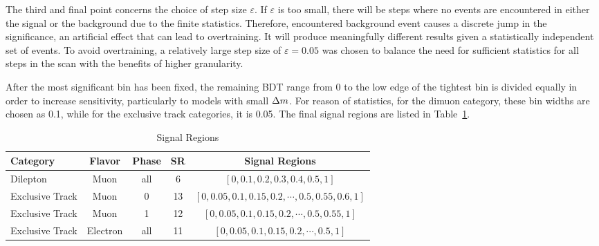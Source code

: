 The third and final point concerns the choice of step size $\varepsilon$. If $\varepsilon$ is too small, there will be steps where no events are encountered in either the signal or the background due to the finite statistics. Therefore, encountered background event causes a discrete jump in the significance, an artificial effect that can lead to overtraining. It will produce meaningfully different results given a statistically independent set of events. To avoid overtraining, a relatively large step size of $\varepsilon=0.05$ was chosen to balance the need for sufficient statistics for all steps in the scan with the benefits of higher granularity.

After the most significant bin has been fixed, the remaining BDT range from 0 to the low edge of the tightest bin is divided equally in order to increase sensitivity, particularly to models with small $\Delta m$. For reason of statistics, for the dimuon category, these bin widths are chosen as 0.1, while for the exclusive track categories, it is 0.05. The final signal regions are listed in Table~\ref{tab:signal-regions}.

\begin{table}[hp]
	\centering
	\label{tab:signal-regions}
		\caption{Signal Regions}
			\begin{tabular}{lcccc} \hline
			Category & Flavor & Phase & SR & Signal Regions \\ \hline
			Dilepton & Muon & all &  6 & $[0,0.1,0.2,0.3,0.4,0.5,1]$ \\
			
			Exclusive Track & Muon & 0 & 13 & $[0,0.05,0.1,0.15,0.2,\cdots,0.5,0.55,0.6,1]$ \\ 
			Exclusive Track & Muon & 1 & 12 & $[0,0.05,0.1,0.15,0.2,\cdots,0.5,0.55,1]$ \\	
			Exclusive Track & Electron & all & 11 & $[0,0.05,0.1,0.15,0.2,\cdots,0.5,1]$ \\			
			
			\hline
			\end{tabular}
\end{table}
